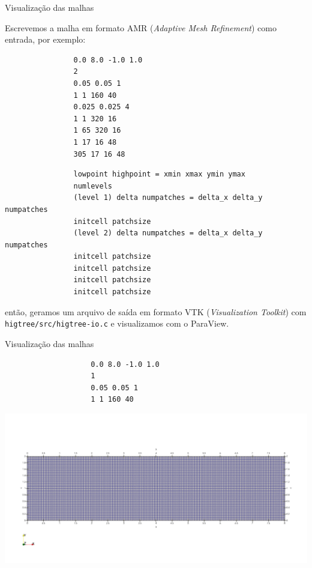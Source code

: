 \documentclass[../main/main.tex]{subfiles}
\begin{document}
\begin{frame}[fragile]{\smaller \smaller Visualização das malhas}
	
	\smaller
  Escrevemos a malha em formato AMR (\textit{Adaptive Mesh Refinement}) como
  entrada, por exemplo:
	
	{\scriptsize
		\begin{minipage}{0.15\textwidth}
			\begin{verbatim}
				0.0 8.0 -1.0 1.0
				2
				0.05 0.05 1
				1 1 160 40
				0.025 0.025 4
				1 1 320 16
				1 65 320 16
				1 17 16 48
				305 17 16 48
			\end{verbatim}
		\end{minipage}
		\hfill
		\begin{minipage}{0.75\textwidth}
			\begin{verbatim}
				lowpoint highpoint = xmin xmax ymin ymax
				numlevels
				(level 1) delta numpatches = delta_x delta_y numpatches
				initcell patchsize
				(level 2) delta numpatches = delta_x delta_y numpatches
				initcell patchsize
				initcell patchsize
				initcell patchsize
				initcell patchsize
			\end{verbatim}
		\end{minipage}
	}
	
	então, geramos um arquivo de saída em formato VTK (\textit{Visualization Toolkit}) com \texttt{higtree/src/higtree-io.c} e visualizamos com o ParaView.
\end{frame}

\begin{frame}[fragile]{\smaller \smaller Visualização das malhas}
	\begin{center}
		\begin{minipage}{0.30\textwidth}
			{\footnotesize
				\begin{verbatim}
					0.0 8.0 -1.0 1.0
					1
					0.05 0.05 1
					1 1 160 40
				\end{verbatim}
			}
		\end{minipage}
		\hfill
		\begin{minipage}{0.65\textwidth}
			\includegraphics[width=\textwidth]{imgs/ref1.png}
		\end{minipage}
	\end{center}
\end{frame}
\end{document}
